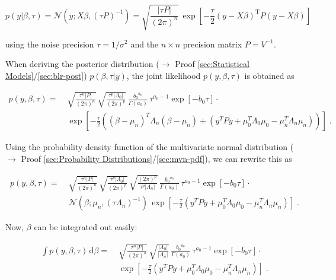 \documentclass[a4paper,12pt,twoside]{book}
\begin{document}
\begin{equation} \label{eq:blr-lme-GLM-LF-Bayes}
p(y|\beta,\tau) = \mathcal{N}(y; X \beta, (\tau P)^{-1}) = \sqrt{\frac{|\tau P|}{(2 \pi)^n}} \, \exp\left[ -\frac{\tau}{2} (y-X\beta)^\mathrm{T} P (y-X\beta) \right]
\end{equation}

using the noise precision $\tau = 1/\sigma^2$ and the $n \times n$ precision matrix $P = V^{-1}$.

\vspace{1em}
When deriving the posterior distribution ($\rightarrow$ Proof \ref{sec:Statistical Models}/\ref{sec:blr-post}) $p(\beta,\tau|y)$, the joint likelihood $p(y,\beta,\tau)$ is obtained as

\begin{equation} \label{eq:blr-lme-GLM-NG-LME-s1}
\begin{split}
p(y,\beta,\tau) = \; & \sqrt{\frac{\tau^n |P|}{(2 \pi)^n}} \, \sqrt{\frac{\tau^p |\Lambda_0|}{(2 \pi)^p}} \, \frac{ {b_0}^{a_0}}{\Gamma(a_0)} \, \tau^{a_0-1} \exp[-b_0 \tau] \cdot \\
& \exp\left[ -\frac{\tau}{2} \left( (\beta-\mu_n)^T \Lambda_n (\beta-\mu_n) + (y^T P y + \mu_0^T \Lambda_0 \mu_0 - \mu_n^T \Lambda_n \mu_n) \right) \right] \; .
\end{split}
\end{equation}

Using the probability density function of the multivariate normal distribution ($\rightarrow$ Proof \ref{sec:Probability Distributions}/\ref{sec:mvn-pdf}), we can rewrite this as

\begin{equation} \label{eq:blr-lme-GLM-NG-LME-s2}
\begin{split}
p(y,\beta,\tau) = \; & \sqrt{\frac{\tau^n |P|}{(2 \pi)^n}} \, \sqrt{\frac{\tau^p |\Lambda_0|}{(2 \pi)^p}} \, \sqrt{\frac{(2 \pi)^p}{\tau^p |\Lambda_n|}} \, \frac{ {b_0}^{a_0}}{\Gamma(a_0)} \, \tau^{a_0-1} \exp[-b_0 \tau] \cdot \\
& \mathcal{N}(\beta; \mu_n, (\tau \Lambda_n)^{-1}) \, \exp\left[ -\frac{\tau}{2} (y^T P y + \mu_0^T \Lambda_0 \mu_0 - \mu_n^T \Lambda_n \mu_n) \right] \; .
\end{split}
\end{equation}

Now, $\beta$ can be integrated out easily:

\begin{equation} \label{eq:blr-lme-GLM-NG-LME-s3}
\begin{split}
\int p(y,\beta,\tau) \, \mathrm{d}\beta = \; & \sqrt{\frac{\tau^n |P|}{(2 \pi)^n}} \, \sqrt{\frac{|\Lambda_0|}{|\Lambda_n|}} \, \frac{ {b_0}^{a_0}}{\Gamma(a_0)} \, \tau^{a_0-1} \exp[-b_0 \tau] \cdot \\
& \exp\left[ -\frac{\tau}{2} (y^T P y + \mu_0^T \Lambda_0 \mu_0 - \mu_n^T \Lambda_n \mu_n) \right] \; .
\end{split}
\end{equation}
\end{document}
